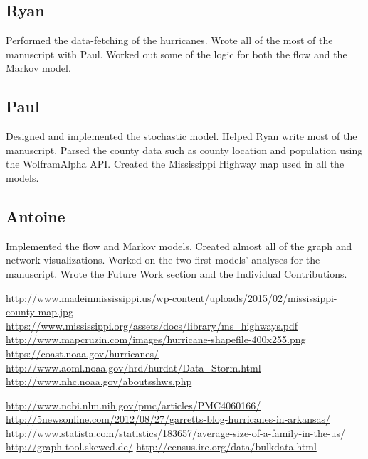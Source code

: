 \documentclass[titlepage]{article}
\begin{document}
\subsection*{Ryan}
Performed the data-fetching of the hurricanes. Wrote all of the most of the manuscript with Paul. Worked out some of the logic for both the flow and the Markov model.

\subsection*{Paul}
Designed and implemented the stochastic model. Helped Ryan write most of the manuscript. Parsed the county data such as county location and population using the WolframAlpha API. Created the Mississippi Highway map used in all the models.

\subsection*{Antoine}
Implemented the flow and Markov models. Created almost all of the graph and network visualizations. Worked on the two first models' analyses for the manuscript. Wrote the Future Work section and the Individual Contributions.

  \begin{thebibliography}{9}
      \url{http://www.madeinmississippi.us/wp-content/uploads/2015/02/mississippi-county-map.jpg}
      \url{https://www.mississippi.org/assets/docs/library/ms_highways.pdf}
      \url{http://www.mapcruzin.com/images/hurricane-shapefile-400x255.png}
      \url{https://coast.noaa.gov/hurricanes/}
      \url{http://www.aoml.noaa.gov/hrd/hurdat/Data_Storm.html}
      \url{http://www.nhc.noaa.gov/aboutsshws.php}


      \url{http://www.ncbi.nlm.nih.gov/pmc/articles/PMC4060166/}
      \url{http://5newsonline.com/2012/08/27/garretts-blog-hurricanes-in-arkansas/}
      \url{http://www.statista.com/statistics/183657/average-size-of-a-family-in-the-us/}
      \url{http://graph-tool.skewed.de/}
      \url{http://census.ire.org/data/bulkdata.html}
  \end{thebibliography}
\end{document}
